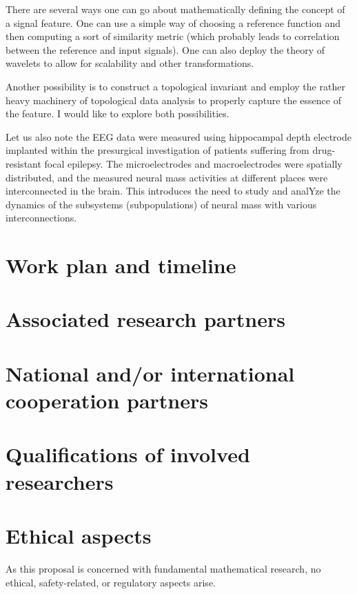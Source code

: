 \documentclass[a4paper,11pt]{scrartcl}
\begin{document}
There are several ways one can go about mathematically defining the concept of a signal feature. One can use a simple way of choosing a reference function and then computing a sort of similarity metric (which probably leads to correlation between the reference and input signals). One can also deploy the theory of wavelets to allow for scalability and other transformations.

Another possibility is to construct a topological invariant and employ the rather heavy machinery of topological data analysis to properly capture the essence of the feature. I would like to explore both possibilities.

Let us also note the EEG data \cite{Brazdil2017} were measured using hippocampal depth electrode implanted within the presurgical investigation of patients suffering from drug-resistant focal epilepsy. The microelectrodes and macroelectrodes were spatially distributed, and the measured neural mass activities at different places were interconnected in the brain. This introduces the need to study and analYze the dynamics of the subsystems (subpopulations) of neural mass with various interconnections.

\section{Work plan and timeline}\label{sec:workplan}

\section{Associated research partners}\label{sec:partners}

\section{National and/or international cooperation partners}\label{sec:cooperations}


\section{Qualifications of involved researchers}\label{sec:qualifications}

\section{Ethical aspects}\label{sec:ethics}

As this proposal is concerned with fundamental mathematical research, no ethical, safety-related, or regulatory aspects arise.
\end{document}
